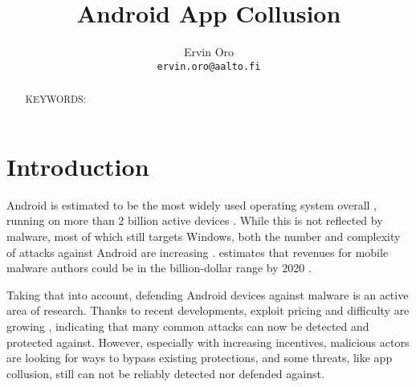 \documentclass[article,oneside]{aaltoseries}
\newcommand{\TODO}[1]{\todo[inline]{#1}}
\begin{document}
 

\title{Android App Collusion}

\author{Ervin Oro%
\\\textnormal{\texttt{ervin.oro@aalto.fi}}} %


\maketitle


\begin{abstract}
	\TODO{abstract}

\vspace{3mm}
\noindent KEYWORDS: 

\end{abstract}




\section{Introduction}

Android is estimated to be the most widely used operating system overall \cite{AWSLLC2018, StatCounter2018}, running on more than 2 billion active devices \cite{AOSP2018}. While this is not reflected by malware,  most of which still targets Windows, both the number and complexity of attacks against Android are increasing \cite{AVTESTGH2018}. \citeauthor{McAfee2018} estimates that revenues for mobile malware authors could be in the billion-dollar range by 2020 \cite{McAfee2018}.

Taking that into account, defending Android devices against malware is an active area of research. Thanks to recent developments, exploit pricing and difficulty are growing \cite{AOSP2018}, indicating that many common attacks can now be detected and protected against. However, especially with increasing incentives, malicious actors are looking for ways to bypass existing protections, and some threats, like app collusion, still can not be reliably detected nor defended against.
\end{document}
